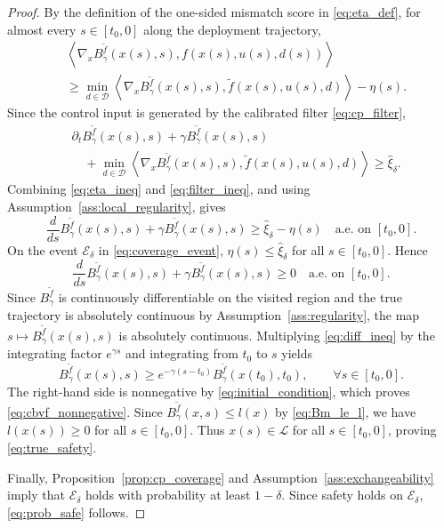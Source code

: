 \documentclass[letterpaper,10pt,conference]{ieeeconf}
\newcommand{\Bm}{B_{\gamma}^{\tilde f}}
\newcommand{\fapp}{\widetilde{f}}
\newcommand{\safe}{\mathcal{L}}
\newcommand{\xv}{x}
\newcommand{\uv}{u}
\newcommand{\dv}{d}
\newcommand{\Dv}{\mathcal{D}}
\newcommand{\ip}[2]{\left\langle #1,#2 \right\rangle}
\begin{document}
\begin{proof}
By the definition of the one-sided mismatch score in \eqref{eq:eta_def}, for
almost every $s\in[t_0,0]$ along the deployment trajectory,
\begin{equation}
\begin{aligned}
    &\ip{\nabla_{\xv}\Bm(\xv(s),s)}
    {f(\xv(s),\uv(s),\dv(s))}  \\
    &\ge
    \min_{\dv\in\Dv}
    \ip{\nabla_{\xv}\Bm(\xv(s),s)}
    {\fapp(\xv(s),\uv(s),\dv)}
    -\eta(s).
\end{aligned}
\label{eq:eta_ineq}
\end{equation}
Since the control input is generated by the calibrated filter
\eqref{eq:cp_filter},
\begin{equation}
\begin{aligned}
    &\partial_t \Bm(\xv(s),s)
    + \gamma \Bm(\xv(s),s) \\
    &\quad+
    \min_{\dv\in\Dv}
    \ip{\nabla_{\xv}\Bm(\xv(s),s)}
    {\fapp(\xv(s),\uv(s),\dv)}
    \ge \widehat\xi_{\delta}.
\end{aligned}
\label{eq:filter_ineq}
\end{equation}
Combining \eqref{eq:eta_ineq} and \eqref{eq:filter_ineq}, and using
Assumption~\ref{ass:local_regularity}, gives
\begin{equation}
    \frac{d}{ds}\Bm(\xv(s),s)
    +\gamma \Bm(\xv(s),s)
    \ge \widehat\xi_{\delta}-\eta(s)
    \quad \text{a.e. on } [t_0,0].
    \label{eq:diff_ineq_pre}
\end{equation}
On the event $\mathcal E_{\delta}$ in \eqref{eq:coverage_event},
$\eta(s)\le \widehat\xi_{\delta}$ for all $s\in[t_0,0]$. Hence
\begin{equation}
    \frac{d}{ds}\Bm(\xv(s),s)
    +\gamma \Bm(\xv(s),s)
    \ge 0
    \quad \text{a.e. on } [t_0,0].
    \label{eq:diff_ineq}
\end{equation}
Since $\Bm$ is continuously differentiable on the visited region and the true
trajectory is absolutely continuous by Assumption~\ref{ass:regularity}, the map
$s\mapsto \Bm(\xv(s),s)$ is absolutely continuous. Multiplying
\eqref{eq:diff_ineq} by the integrating factor $e^{\gamma s}$ and integrating
from $t_0$ to $s$ yields
\begin{equation}
    \Bm(\xv(s),s)
    \ge
    e^{-\gamma(s-t_0)}\Bm(\xv(t_0),t_0),
    \qquad \forall s\in[t_0,0].
    \label{eq:cbvf_lb}
\end{equation}
The right-hand side is nonnegative by \eqref{eq:initial_condition}, which proves
\eqref{eq:cbvf_nonnegative}. Since $\Bm(\xv,s)\le l(\xv)$ by
\eqref{eq:Bm_le_l}, we have $l(\xv(s))\ge 0$ for all $s\in[t_0,0]$. Thus
$\xv(s)\in\safe$ for all $s\in[t_0,0]$, proving \eqref{eq:true_safety}.

Finally, Proposition~\ref{prop:cp_coverage} and
Assumption~\ref{ass:exchangeability} imply that $\mathcal E_{\delta}$ holds
with probability at least $1-\delta$. Since safety holds on
$\mathcal E_{\delta}$, \eqref{eq:prob_safe} follows.
\end{proof}
\end{document}
